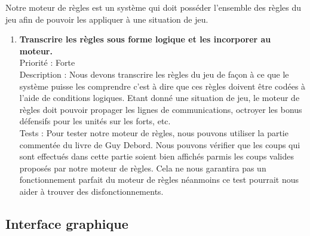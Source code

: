 \documentclass[12pt]{article}
\begin{document}
			Notre moteur de règles est un système qui doit posséder l'ensemble des règles du jeu afin de pouvoir les appliquer à une situation de jeu.

			\begin{enumerate}

				\item \textbf{Transcrire les règles sous forme logique et les incorporer au moteur.} 
				\\[0.7\baselineskip]
				Priorité : Forte 
				\\[0.7\baselineskip]
				Description : Nous devons transcrire les règles du jeu de façon à ce que le système puisse les comprendre c'est à dire que ces 
				règles doivent être codées à l'aide de conditions logiques. Etant donné une situation de jeu, le moteur de règles doit pouvoir 
				propager les lignes de communications, octroyer les bonus défensifs pour les unités sur les forts, etc.
				\\[0.7\baselineskip]
				Tests : Pour tester notre moteur de règles, nous pouvons utiliser la partie commentée du livre de Guy Debord. Nous pouvons 
				vérifier que les coups qui sont effectués dans cette partie soient bien affichés parmis les coups valides proposés par notre 
				moteur de règles. Cela ne nous garantira pas un fonctionnement parfait du moteur de règles néanmoins ce test pourrait nous 
				aider à trouver des disfonctionnements. 
				\\[0.7\baselineskip]
				
			\end{enumerate}

		\subsection{Interface graphique}
\end{document}
